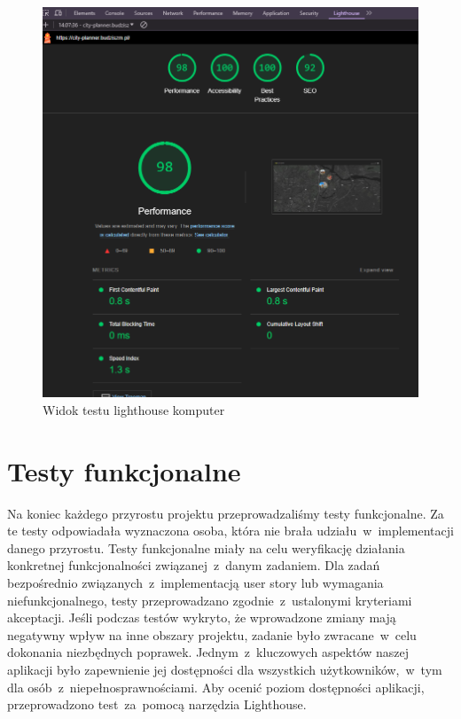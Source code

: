     \begin{figure}[H]
        \centering
        \includegraphics[width=1\textwidth]{attachments/lighthouse}
        \caption{Widok testu lighthouse komputer}
        \label{fig:testy-lighthouse-desktop}
        \end{figure}
\section{Testy funkcjonalne}
\label{sec:testy-funkcjonalne}

Na koniec każdego przyrostu projektu przeprowadzaliśmy testy funkcjonalne. Za te testy odpowiadała wyznaczona osoba, która nie brała udziału~w~implementacji danego przyrostu. 
Testy funkcjonalne miały na celu weryfikację działania konkretnej funkcjonalności związanej~z~danym zadaniem. \newline
Dla zadań bezpośrednio związanych~z~implementacją user story lub wymagania niefunkcjonalnego, testy przeprowadzano zgodnie~z~ustalonymi kryteriami akceptacji. \newline
Jeśli podczas testów wykryto, że wprowadzone zmiany mają negatywny wpływ na inne obszary projektu, zadanie było zwracane~w~celu dokonania niezbędnych poprawek.\newline
\indent Jednym~z~kluczowych aspektów naszej aplikacji było zapewnienie jej dostępności dla wszystkich użytkowników,~w~tym dla osób~z~niepełnosprawnościami.
 Aby ocenić poziom dostępności aplikacji, przeprowadzono test~za~pomocą narzędzia Lighthouse.

